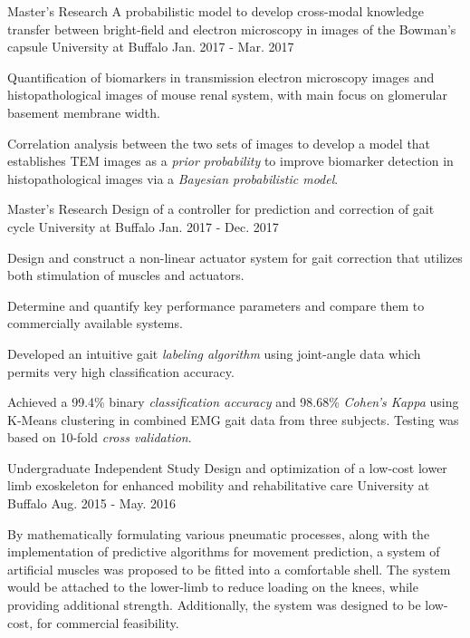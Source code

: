 \begin{cventries}
  \cventry
    {Master's Research} %
    {A probabilistic model to develop cross-modal knowledge transfer between bright-field and electron microscopy in images of the Bowman's capsule} %
    {University at Buffalo} %
    {Jan. 2017 - Mar. 2017} %
    {
      \begin{cvitems} %
        \item {Quantification of biomarkers in transmission electron microscopy images and histopathological images of mouse renal system, with main focus on glomerular basement membrane width.}
        \item {Correlation analysis between the two sets of images to develop a model that establishes TEM images as a \emph{prior probability} to improve biomarker detection in histopathological images via a \emph{Bayesian probabilistic model}.}
      \end{cvitems}
    }
    
  \cventry
    {Master's Research} %
    {Design of a controller for prediction and correction of gait cycle} %
    {University at Buffalo} %
    {Jan. 2017 - Dec. 2017} %
    {
      \begin{cvitems} %
        \item {Design and construct a non-linear actuator system for gait correction that utilizes both stimulation of muscles and actuators.}
        \item {Determine and quantify key performance parameters and compare them to commercially available systems.}
        \item{Developed an intuitive gait \emph{labeling algorithm} using joint-angle data which permits very high classification accuracy.}
        \item{Achieved a 99.4\% binary \emph{classification accuracy} and 98.68\% \emph{Cohen's Kappa} using K-Means clustering in combined EMG gait data from three subjects. Testing was based on 10-fold \emph{cross validation}.}
      \end{cvitems}
    }
    
  \cventry
    {Undergraduate Independent Study} %
    {Design and optimization of a low-cost lower limb exoskeleton for enhanced mobility and rehabilitative care} %
    {University at Buffalo} %
    {Aug. 2015 - May. 2016} %
    {
      \begin{cvitems} %
        \item {By mathematically formulating various pneumatic processes, along with the implementation of predictive algorithms for movement prediction, a system of artificial muscles was proposed to be fitted into a comfortable shell. The system would be attached to the lower-limb to reduce loading on the knees, while providing additional strength. Additionally, the system was designed to be low-cost, for commercial feasibility.
}
      \end{cvitems}
    }


\end{cventries}
